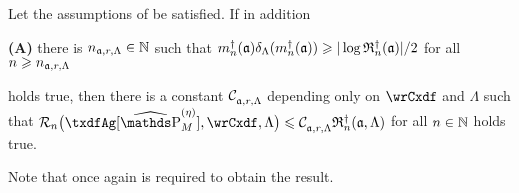\begin{cor}
  Let the assumptions of  be satisfied.  If in
  addition
  \begin{inparaenum}\item[{{\dgrau\bfseries(A)}}]
    there is $\ssY_{\xdfCw[],\xdfCr,\Lambda}\in\Nz$  such that
    $\aDi{\ssY}({\xdfCw[]})\cmSv[\aDi{\ssY}({\xdfCw[]})]\geq \vert \log\naRa{(\xdfCw[])} \vert/2 $
    for all $\ssY\geq \ssY_{\xdfCw[],\xdfCr,\Lambda}$
  \end{inparaenum}
  holds true, then there is a constant $\cst{\xdfCw[],\xdfCr,\Lambda}$
  depending only on $\rwCxdf$ and $\Lambda$ such that
  $ \nRi{\txdfAg[{\erWe[]}]}{\rwCxdf,\Lambda} \leq
  \cst{\xdfCw[],\xdfCr,\Lambda}\naRa{(\xdfCw[],\Lambda)}$ for all $n\in\Nz$
  holds true.
  \reEnd
\end{cor}

Note that once again  is required to obtain the result.